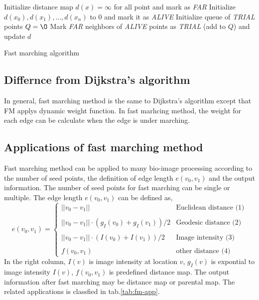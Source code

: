 \begin{algorithm}[H]
\label{alg:fast-marching}
\SetAlgoLined
{}
Initialize distance map $d(x) = \infty$ for all point and mark as \emph{FAR} \;
Initialize $d(x_0),d(x_1),\ldots,d(x_n)$ to $0$ and mark it as \emph{ALIVE} \;
Initialize queue of \emph{TRIAL} points $Q = \O$ \;
Mark \emph{FAR} neighbors of \emph{ALIVE} points as \emph{TRIAL} (add to $Q$) and update $d$ \;
\caption{Fast marching algorithm}
\end{algorithm}

\subsection{Differnce from Dijkstra's algorithm}
In general, fast marching method is the same to Dijkstra's algorithm except that FM applys dynamic weight function. In fast marhcing method, the weight for each edge can be calculate when the edge is under marching.
\subsection{Applications of fast marching method}
Fast marching method can be applied to many bio-image processing according to the number of seed points, the definition of edge length $e(v_0,v_1)$ and the output information. The number of seed points for fast marching can be single or multiple. The edge length $e(v_0,v_1)$ can be defined as,
$$
e(v_0,v_1) = \left\{ 
    \begin{array}{lr}
    ||v_0 - v_1|| & \mbox{Euclidean distance (1)} \\
    \\
    ||v_0 - v_1|| \cdot (g_I(v_0) + g_I(v_1))/2 & \mbox{Geodesic distance (2)} \\
    \\
    ||v_0 - v_1|| \cdot (I(v_0) + I(v_1))/2 & \mbox{Image intensity (3)} \\
    \\
    f(v_0,v_1) & \mbox{other distance (4)}
    \end{array}
    \right.
$$
In the right column, $I(v)$ is image intensity at location $v$, $g_I(v)$ is expontial to image intensity $I(v)$, $f(v_0,v_1)$ is predefined distance map. The output information after fast marching may be distance map or parental map.  The related applications is classfied in tab.\ref{tab:fm-app}.\\

